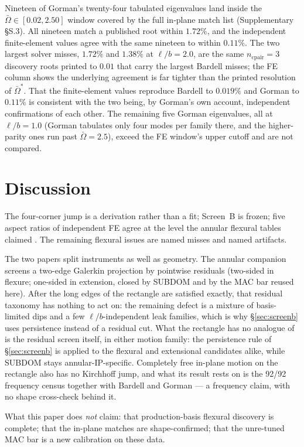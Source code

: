 \documentclass[11pt]{article}
\begin{document}
Nineteen of Gorman's twenty-four tabulated eigenvalues land inside the
$\bar\Omega\in[0.02,2.50]$ window covered by the full in-plane match list
(Supplementary \S{}S.3). All nineteen match a published root within
$1.72\%$, and the independent finite-element values agree with the same
nineteen to within $0.11\%$. The two largest solver misses, $1.72\%$ and
$1.38\%$ at $\ell/b=2.0$, are the same $n_{\mathrm{cpair}}=3$ discovery
roots printed to $0.01$ that carry the largest Bardell misses; the FE
column shows the underlying agreement is far tighter than the printed
resolution of $\bar\Omega^{*}$. That the finite-element values reproduce
Bardell to $0.019\%$ and Gorman to $0.11\%$ is consistent with the two
being, by Gorman's own account, independent confirmations of each other.
The remaining five Gorman eigenvalues, all at $\ell/b=1.0$ (Gorman
tabulates only four modes per family there, and the higher-parity ones run
past $\bar\Omega=2.5$), exceed the FE window's upper cutoff and are not
compared.

\section{Discussion}\label{sec:disc}
The four-corner jump is a derivation rather than a fit; Screen~B is
frozen; five aspect ratios of independent FE agree at the level the
annular flexural tables claimed \cite{mccune2026annular}. The remaining
flexural issues are named misses and named artifacts.

The two papers split instruments as well as geometry. The annular
companion screens a two-edge Galerkin projection by pointwise residuals
(two-sided in flexure; one-sided in extension, closed by SUBDOM and by
the MAC bar reused here). After the long edges of the rectangle are
satisfied exactly, that residual taxonomy has nothing to act on: the
remaining defect is a mixture of basis-limited dips and a few
$\ell/b$-independent leak families, which is why \S\ref{sec:screenb}
uses persistence instead of a residual cut. What the rectangle has no
analogue of is the residual screen itself, in either motion family: the
persistence rule of \S\ref{sec:screenb} is applied to the flexural and
extensional candidates alike, while SUBDOM stays annular-IP-specific.
Completely free in-plane motion on the rectangle also has no Kirchhoff
jump, and what its result rests on is the 92/92 frequency census together
with Bardell and Gorman --- a frequency claim, with no shape cross-check
behind it.

What this paper does \emph{not} claim: that production-basis flexural
discovery is complete; that the in-plane matches are shape-confirmed; that
the unre-tuned MAC bar is a new calibration on these data.
\end{document}
